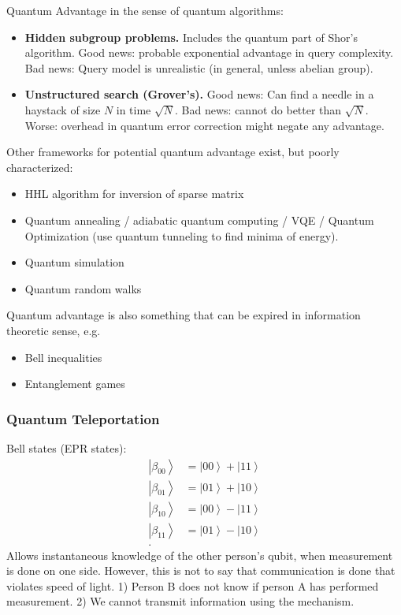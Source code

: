 
Quantum Advantage in the sense of quantum algorithms:
\begin{itemize}
	\item \textbf{Hidden subgroup problems.} Includes the quantum part of Shor's algorithm. Good news: probable exponential advantage in query complexity. Bad news: Query model is unrealistic (in general, unless abelian group).
	\item \textbf{Unstructured search (Grover's).} Good news: Can find a needle in a haystack of size $N$ in time $\sqrt{N}$. Bad news: cannot do better than $\sqrt{N} $. Worse: overhead in quantum error correction might negate any advantage.

\end{itemize}


Other frameworks for potential quantum advantage exist, but poorly characterized:

\begin{itemize}
	\item HHL algorithm for inversion of sparse matrix
	\item Quantum annealing / adiabatic quantum computing / VQE / Quantum Optimization (use quantum tunneling to find minima of energy).

	\item Quantum simulation
	\item Quantum random walks
\end{itemize}

Quantum advantage is also something that can be expired in information theoretic sense, e.g.
\begin{itemize}
	\item Bell inequalities
	\item Entanglement games
\end{itemize}

\subsubsection{Quantum Teleportation}

Bell states (EPR states): 
\begin{align*}
\left| \beta_{0 0} \right\rangle  &= \left| 00 \right\rangle + \left| 11 \right\rangle \\
\left| \beta_{0 1} \right\rangle  &= \left| 01 \right\rangle + \left| 10 \right\rangle \\
\left| \beta_{1 0} \right\rangle  &= \left| 00 \right\rangle - \left| 11 \right\rangle \\
\left| \beta_{1 1} \right\rangle  &= \left| 01 \right\rangle - \left| 10 \right\rangle \\
.\end{align*}
Allows instantaneous knowledge of the other person's qubit, when measurement is done on one side. However, this is not to say that communication is done that violates speed of light. 1) Person B does not know if person A has performed measurement. 2) We cannot transmit information using the mechanism.

